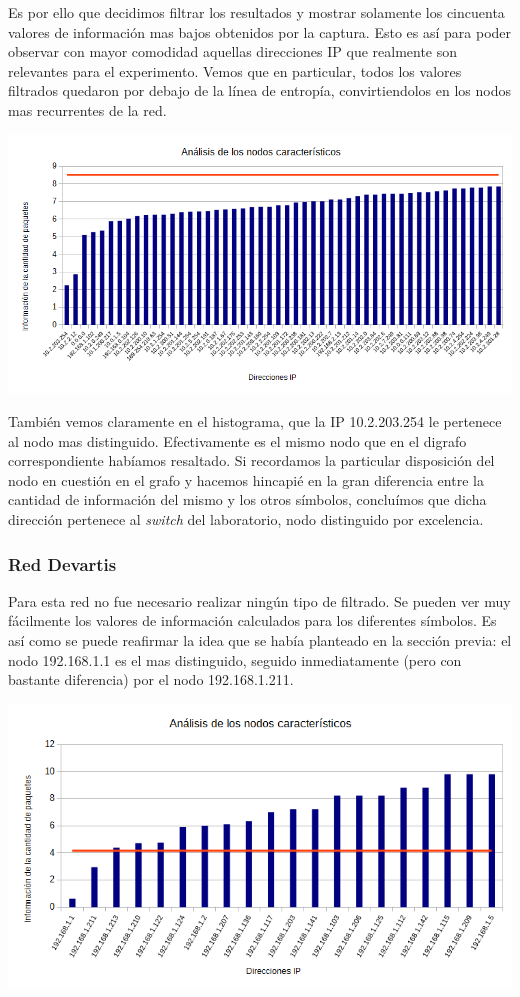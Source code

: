 Es por ello que decidimos filtrar los resultados y mostrar solamente los cincuenta valores de información mas bajos obtenidos por la captura. Esto es así para poder observar con mayor comodidad aquellas direcciones IP que realmente son relevantes para el experimento. Vemos que en particular, todos los valores filtrados quedaron por debajo de la línea de entropía, convirtiendolos en los nodos mas recurrentes de la red.

\centerline{\includegraphics[width=1\textwidth]{./graficos/paquetesVSIP/labo5.png}}

También vemos claramente en el histograma, que la IP 10.2.203.254 le pertenece al nodo mas distinguido. Efectivamente es el mismo nodo que en el digrafo correspondiente habíamos resaltado. Si recordamos la particular disposición del nodo en cuestión en el grafo y hacemos hincapié en la gran diferencia entre la cantidad de información del mismo y los otros símbolos, concluímos que dicha dirección pertenece al \textit{switch} del laboratorio, nodo distinguido por excelencia.

\subsubsection{Red Devartis}

Para esta red no fue necesario realizar ningún tipo de filtrado. Se pueden ver muy fácilmente los valores de información calculados para los diferentes símbolos. Es así como se puede reafirmar la idea que se había planteado en la sección previa: el nodo 192.168.1.1 es el mas distinguido, seguido inmediatamente (pero con bastante diferencia) por el nodo 192.168.1.211.

\centerline{\includegraphics[width=1\textwidth]{./graficos/paquetesVSIP/laburo_mari.png}}

